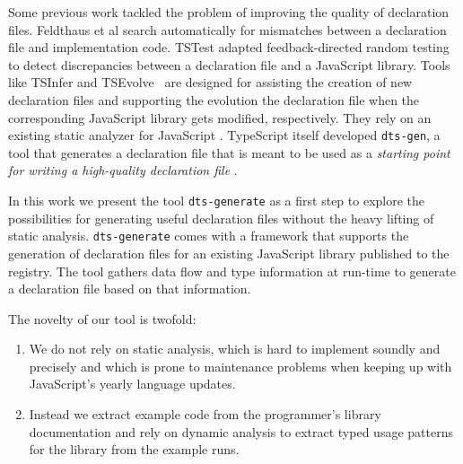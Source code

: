 \documentclass[english,cleveref,autoref,submission]{programming}
\begin{document}
Some previous work tackled the problem of improving the quality of
declaration files. Feldthaus et al
\cite{DBLP:conf/oopsla/FeldthausM14} search automatically for
mismatches between a declaration file and implementation code. TSTest
\cite{DBLP:journals/pacmpl/KristensenM17}
adapted feedback-directed random testing to detect discrepancies between a
declaration file and a JavaScript library. Tools like TSInfer and
TSEvolve~\cite{DBLP:conf/fase/KristensenM17} are designed for
assisting the creation of new declaration 
files and supporting the evolution the declaration file when the
corresponding JavaScript library gets modified, respectively. They
rely on an existing static analyzer for JavaScript \cite{DBLP:conf/sas/JensenMT09}.
TypeScript itself
developed \texttt{dts-gen}, a tool that generates a
declaration file that is meant to be used as a \emph{starting point
for writing a high-quality declaration file} \cite{dts-gen}.

In this work we present the tool \texttt{dts-generate}
as a first step to explore the possibilities for
generating useful declaration files without the heavy lifting of
static analysis. \texttt{dts-generate} comes with a framework that
supports the generation of declaration files for an existing
JavaScript library published to the \NPM{} registry. The tool gathers
data flow and type information at run-time to generate a declaration
file based on that information.

The novelty of our tool is twofold:
\begin{enumerate}
\item 
  We do not rely on static analysis, which is hard to implement
  soundly and precisely and which is prone to maintenance problems
  when keeping up with JavaScript's yearly language updates.
\item
  Instead we extract example code from the programmer's library
  documentation and rely on dynamic analysis to extract typed usage
  patterns for the library from the example runs.
\end{enumerate}

\end{document}
